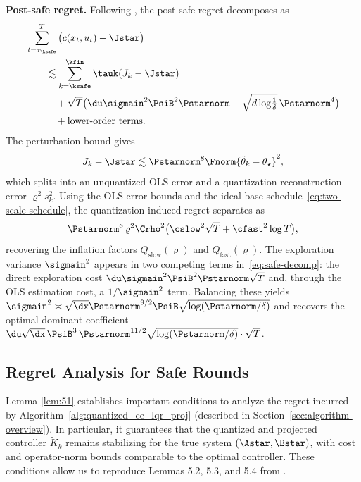 \documentclass[11pt,journal,onecolumn]{IEEEtran}
\begin{document}
\textbf{Post-safe regret.} Following \cite[Lem. 5.2]{simchowitz20a}, the post-safe regret decomposes as 
\begin{equation}\label{eq:safe-decomp}
    \begin{split}
        &\sum_{t=\tau_{\ksafe}}^{T} \big(c(x_t,u_t) - \Jstar\big) \\
        &\qquad\lesssim \sum_{k=\ksafe}^{\kfin} \tauk (J_k - \Jstar) \\
        &\qquad\quad + \sqrt{T}\big(\du\sigmain^2\PsiB^2\Pstarnorm + \sqrt{d\log\!\tfrac{1}{\delta}}\,\Pstarnorm^4\big) \\
        &\qquad\quad + \text{lower-order terms}.
    \end{split}
\end{equation}
The perturbation bound gives
\begin{equation}
J_k - \Jstar \lesssim \Pstarnorm^8 \Fnorm{\tilde\theta_k - \theta_\star}^2,
\end{equation}
which splits into an unquantized OLS error and a quantization reconstruction error $\varrho^2 s_k^2$. Using the OLS error bounds and the ideal base schedule~\eqref{eq:two-scale-schedule}, the quantization-induced regret separates as
\begin{equation}\label{eq:quant-regret-split}
    \Pstarnorm^8\,\varrho^2\Crho^2 \big(\cslow^2\sqrt{T} + \cfast^2 \log T\big),
\end{equation}
recovering the inflation factors $Q_{\mathrm{slow}}(\varrho)$ and $Q_{\mathrm{fast}}(\varrho)$. The exploration variance $\sigmain^2$ appears in two competing terms in~\eqref{eq:safe-decomp}: the direct exploration cost $\du\sigmain^2\PsiB^2\Pstarnorm\sqrt{T}$ and, through the OLS estimation cost, a $1/\sigmain^2$ term. Balancing these yields $\sigmain^2 \asymp \sqrt{\dx}\Pstarnorm^{9/2}\PsiB\sqrt{\log(\Pstarnorm/\delta)}$ and recovers the optimal dominant coefficient $\du\sqrt{\dx}\,\PsiB^3\,\Pstarnorm^{11/2}\sqrt{\log(\Pstarnorm/\delta)} \cdot \sqrt{T}$.

\subsection{Regret Analysis for Safe Rounds}
\label{sec:regret-safe-rounds}

Lemma \ref{lem:51} establishes important conditions to analyze the regret incurred by Algorithm~\ref{alg:quantized_ce_lqr_proj} (described in Section~\ref{sec:algorithm-overview}). In particular, it guarantees that the quantized and projected controller $\tilde K_k$ remains stabilizing for the true system $(\Astar,\Bstar)$, with cost and operator-norm bounds comparable to the optimal controller. These conditions allow us to reproduce Lemmas 5.2, 5.3, and 5.4 from \cite{simchowitz20a}.
\end{document}
